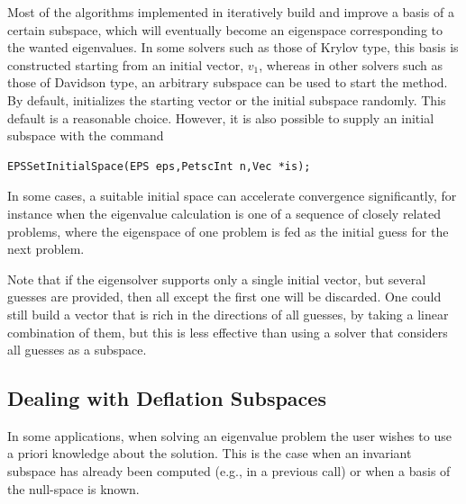 	Most of the algorithms implemented in  iteratively build and improve a basis of a certain subspace, which will eventually become an eigenspace corresponding to the wanted eigenvalues. In some solvers such as those of Krylov type, this basis is constructed starting from an initial vector, $v_1$, whereas in other solvers such as those of Davidson type, an arbitrary subspace can be used to start the method. By default,  initializes the starting vector or the initial subspace randomly. This default is a reasonable choice. However, it is also possible to supply an initial subspace with the command
	\begin{Verbatim}[fontsize=\small]
	EPSSetInitialSpace(EPS eps,PetscInt n,Vec *is);
	\end{Verbatim}
In some cases, a suitable initial space can accelerate convergence significantly, for instance when the eigenvalue calculation is one of a sequence of closely related problems, where the eigenspace of one problem is fed as the initial guess for the next problem.

Note that if the eigensolver supports only a single initial vector, but several guesses are provided, then all except the first one will be discarded. One could still build a vector that is rich in the directions of all guesses, by taking a linear combination of them, but this is less effective than using a solver that considers all guesses as a subspace.

\subsection{Dealing with Deflation Subspaces}

	In some applications, when solving an eigenvalue problem the user wishes to use a priori knowledge about the solution. This is the case when an invariant subspace has already been computed (e.g., in a previous  call) or when a basis of the null-space is known.

